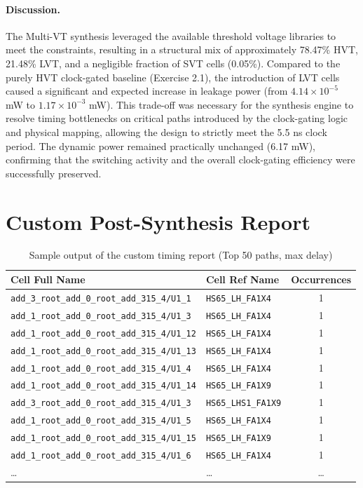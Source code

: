 \documentclass[11pt,a4paper]{article}
\begin{document}
\paragraph{Discussion.} 
The Multi-VT synthesis leveraged the available threshold voltage libraries to meet the constraints, resulting in a structural mix of approximately 78.47\% HVT, 21.48\% LVT, and a negligible fraction of SVT cells (0.05\%). Compared to the purely HVT clock-gated baseline (Exercise 2.1), the introduction of LVT cells caused a significant and expected increase in leakage power (from $4.14 \times 10^{-5}$ mW to $1.17 \times 10^{-3}$ mW). This trade-off was necessary for the synthesis engine to resolve timing bottlenecks on critical paths introduced by the clock-gating logic and physical mapping, allowing the design to strictly meet the 5.5 ns clock period. The dynamic power remained practically unchanged (6.17 mW), confirming that the switching activity and the overall clock-gating efficiency were successfully preserved.

\section{Custom Post-Synthesis Report}

\begin{table}[h]
\centering
\caption{Sample output of the custom timing report (Top 50 paths, max delay)}
\label{tab:custom_report}
\begin{tabular}{llc}
\toprule
\textbf{Cell Full Name} & \textbf{Cell Ref Name} & \textbf{Occurrences} \\
\midrule
\texttt{add\_3\_root\_add\_0\_root\_add\_315\_4/U1\_1}  & \texttt{HS65\_LH\_FA1X4}   & 1 \\
\texttt{add\_1\_root\_add\_0\_root\_add\_315\_4/U1\_3}  & \texttt{HS65\_LH\_FA1X4}   & 1 \\
\texttt{add\_1\_root\_add\_0\_root\_add\_315\_4/U1\_12} & \texttt{HS65\_LH\_FA1X4}   & 1 \\
\texttt{add\_1\_root\_add\_0\_root\_add\_315\_4/U1\_13} & \texttt{HS65\_LH\_FA1X4}   & 1 \\
\texttt{add\_1\_root\_add\_0\_root\_add\_315\_4/U1\_4}  & \texttt{HS65\_LH\_FA1X4}   & 1 \\
\texttt{add\_1\_root\_add\_0\_root\_add\_315\_4/U1\_14} & \texttt{HS65\_LH\_FA1X9}   & 1 \\
\texttt{add\_3\_root\_add\_0\_root\_add\_315\_4/U1\_3}  & \texttt{HS65\_LHS1\_FA1X9} & 1 \\
\texttt{add\_1\_root\_add\_0\_root\_add\_315\_4/U1\_5}  & \texttt{HS65\_LH\_FA1X4}   & 1 \\
\texttt{add\_1\_root\_add\_0\_root\_add\_315\_4/U1\_15} & \texttt{HS65\_LH\_FA1X9}   & 1 \\
\texttt{add\_1\_root\_add\_0\_root\_add\_315\_4/U1\_6}  & \texttt{HS65\_LH\_FA1X4}   & 1 \\
\dots & \dots & \dots \\
\bottomrule
\end{tabular}
\end{table}
\end{document}
